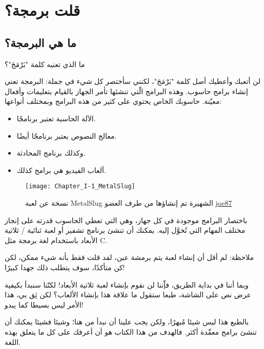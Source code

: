 \chapter{قلت برمجة؟}

\section{ما هي البرمجة؟}

\begin{question}
  ما الذي تعنيه كلمة "بَرْمَجَ"؟
\end{question}

لن أتعبك وأعطيك أصل كلمة "بَرْمَجَ"، لكنني سأختصر كل شيء في جملة: البرمجة تعني إنشاء برامج حاسوب. وهذه البرامج الّتي تنشئها تأمر الجهاز بالقيام بتعليمات وأفعال معيّنة.
حاسوبك الخاص يحتوي على كثير من هذه البرامج وبمختلف أنواعها:

\begin{itemize}
  \item الآلة الحاسبة تعتبر برنامجًا.
  \item معالج النصوص يعتبر برنامجًا أيضًا.
  \item وكذلك برنامج المحادثة.
  \item ألعاب الفيديو هي برامج كذلك.
\end{itemize}

\begin{figure}[H]
	\centering
	\texttt{[image: Chapter\_I-1\_MetalSlug]}
	
نسخة عن لعبة \textenglish{MetalSlug} الشهيرة تم إنشاؤها من طرف العضو \href{http://www.siteduzero.com/membres-294-176405.html}{\textenglish{joe87}}	
\end{figure}

باختصار البرامج موجودة في كل جهاز، وهي التي تعطي الحاسوب قدرته على إنجاز مختلف المهام التي تُخوَّل إليه. يمكنك أن تنشئ برنامج تشفير أو لعبة ثنائية / ثلاثية الأبعاد باستخدام لغة برمجة مثل \textenglish{C}.

ملاحظة: لم أقل أن إنشاء لعبة يتم برمشة عين، لقد قلت فقط بأنه شيء ممكن، لكن كن متأكدًا، سوف يتطلب ذلك جهدا كبيرًا!

وبما أننا في بداية الطريق، فإّننا لن نقوم بإنشاء لعبة ثلاثية الأبعاد! لكنّنا سنبدأ بكيفية عرض نص على الشاشة، طبعا ستقول ما علاقة هذا بإنشاء الألعاب؟ لكن ثِق بي، هذا الأمر ليس بسيطا كما يبدو!

بالطبع هذا ليس شيئا مُبهرًا، ولكن يجب علينا أن نبدأ من هنا؛ وشيئا فشيئا يمكنك أن تنشئ برامج معقّدة أكثر. فالهدف من هذا الكتاب هو أن أعرفك على كل ما يتعلق بهذه اللغة.

